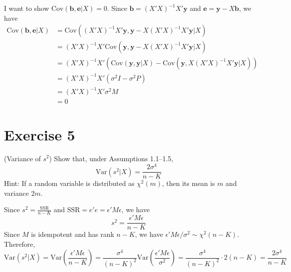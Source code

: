 \documentclass[12pt, letterpaper, onecolumn]{exam}
\begin{document}
\begin{solution}
    I want to show $\text{Cov}(\mathbf{b}, \mathbf{e}|X) = 0$. Since
    $\mathbf{b}= (X'X)^{-1}X'\mathbf{y}$ and
    $\mathbf{e}= \mathbf{y}- X\mathbf{b}$, we have
    \begin{align*}
        \text{Cov}(\mathbf{b}, \mathbf{e}|X) & = \text{Cov}((X'X)^{-1}X'\mathbf{y}, \mathbf{y}- X(X'X)^{-1}X'\mathbf{y}|X)                             \\
                                             & = (X'X)^{-1}X'\text{Cov}(\mathbf{y}, \mathbf{y}- X(X'X)^{-1}X'\mathbf{y}|X)                             \\
                                             & = (X'X)^{-1}X'(\text{Cov}(\mathbf{y}, \mathbf{y}|X)- \text{Cov}(\mathbf{y}, X(X'X)^{-1}X'\mathbf{y}|X)) \\
                                             & = (X'X)^{-1}X'(\sigma^{2}I - \sigma^{2}P)                                                               \\
                                             & = (X'X)^{-1}X'\sigma^{2}M                                                                               \\
                                             & = 0
    \end{align*}
\end{solution}

\section*{Exercise 5}
 (Variance of $s^{2}$) Show that, under Assumptions 1.1--1.5,
\[
    \text{Var}(s^{2}|X) = \frac{2\sigma^{4}}{n - K}
\]
Hint: If a random variable is distributed as $\chi^{2}(m)$, then its mean is
$m$ and variance $2m$.

\begin{solution}
    Since $s^{2}= \frac{\text{SSR}}{n-K}$ and $\text{SSR}= e'e = \epsilon'M\epsilon$,
    we have
    \[
        s^{2}= \frac{\epsilon'M\epsilon}{n-K}
    \]
    Since $M$ is idempotent and has rank $n-K$, we have $\epsilon'M\epsilon/\sigma
        ^{2}\sim \chi^{2}(n-K)$. Therefore,
    \[
        \text{Var}(s^{2}|X) = \text{Var}\left(\frac{\epsilon'M\epsilon}{n-K}\right
        ) = \frac{\sigma^{4}}{(n-K)^{2}}\text{Var}\left(\frac{\epsilon'M\epsilon}{\sigma^{2}}
        \right) = \frac{\sigma^{4}}{(n - K)^{2}}\cdot 2(n-K) = \frac{2\sigma^{4}}{n
            - K}
    \]
\end{solution}
\end{document}
